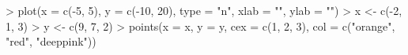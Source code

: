 \begin{Schunk}
\begin{Sinput}
> plot(x = c(-5, 5), y = c(-10, 20), type = "n", xlab = "", ylab = "")
> x <- c(-2, 1, 3)
> y <- c(9, 7, 2)
> points(x = x, y = y, cex = c(1, 2, 3), col = c("orange", "red", "deeppink"))
\end{Sinput}
\end{Schunk}
